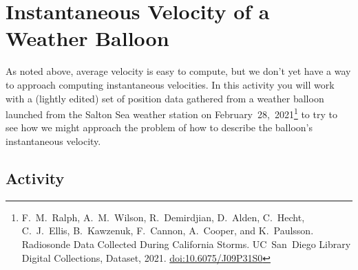 \newpage
\section{Instantaneous Velocity of a Weather Balloon}
\label{sec:balloon}

As noted above, average velocity is easy to compute, but we don't yet have a way to approach computing instantaneous velocities. In this activity you will work with a (lightly edited) set of position data gathered from a weather balloon launched from the Salton Sea weather station on February~28,~2021\footnote{F.~M.~Ralph, A.~M.~Wilson, R.~Demirdjian, D.~Alden, C.~Hecht, C.~J.~Ellis, B.~Kawzenuk, F.~Cannon, A.~Cooper, and K.~Paulsson. Radiosonde Data Collected During California Storms. UC~San~Diego Library Digital Collections, Dataset, 2021. \href{https://doi.org/10.6075/J09P31S0}{doi:10.6075/J09P31S0}} to try to see how we might approach the problem of how to describe the balloon's instantaneous velocity.

\subsection*{Activity}

